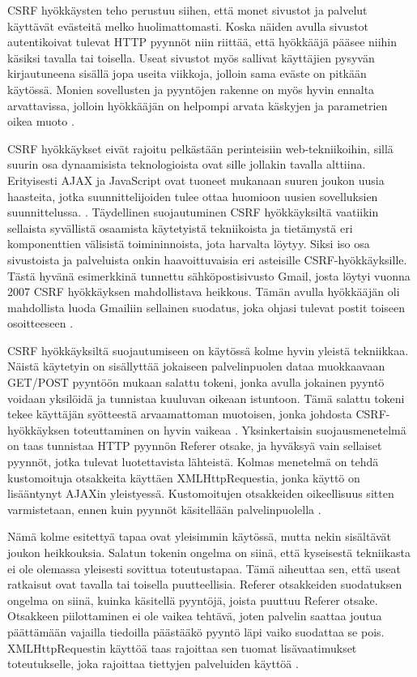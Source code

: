 CSRF hyökkäysten teho perustuu siihen, että monet sivustot ja palvelut käyttävät evästeitä melko huolimattomasti. Koska näiden avulla sivustot autentikoivat tulevat 
HTTP pyynnöt niin riittää, että hyökkääjä pääsee niihin käsiksi tavalla tai toisella. Useat sivustot myös sallivat käyttäjien pysyvän kirjautuneena sisällä
jopa useita viikkoja, jolloin sama eväste on pitkään käytössä. Monien sovellusten ja pyyntöjen rakenne on myös hyvin ennalta arvattavissa, jolloin hyökkääjän
on helpompi arvata käskyjen ja parametrien oikea muoto \cite{WEB2}.

CSRF hyökkäykset eivät rajoitu pelkästään perinteisiin web-tekniikoihin, sillä suurin osa dynaamisista teknologioista ovat sille jollakin 
tavalla alttiina. Erityisesti AJAX ja JavaScript ovat tuoneet mukanaan suuren joukon uusia haasteita, jotka suunnittelijoiden tulee ottaa huomioon uusien
sovelluksien suunnittelussa. \cite{WEB2b}. Täydellinen suojautuminen CSRF hyökkäyksiltä vaatiikin sellaista syvällistä osaamista käytetyistä tekniikoista ja 
tietämystä eri komponenttien välisistä toimininnoista, jota harvalta löytyy. Siksi iso osa sivustoista ja palveluista onkin haavoittuvaisia eri asteisille
CSRF-hyökkäyksille. Tästä hyvänä esimerkkinä tunnettu sähköpostisivusto Gmail, josta löytyi vuonna 2007 CSRF hyökkäyksen mahdollistava heikkous. Tämän avulla
hyökkääjän oli mahdollista luoda Gmailiin sellainen suodatus, joka ohjasi tulevat postit toiseen osoitteeseen \cite{CSRF}. 

CSRF hyökkäyksiltä suojautumiseen on käytössä kolme hyvin yleistä tekniikkaa. Näistä käytetyin on sisällyttää jokaiseen palvelinpuolen dataa muokkaavaan
GET/POST pyyntöön mukaan salattu tokeni, jonka avulla jokainen pyyntö voidaan yksilöidä ja tunnistaa kuuluvan oikeaan istuntoon. Tämä salattu tokeni tekee
käyttäjän syötteestä arvaamattoman muotoisen, jonka johdosta CSRF-hyökkäyksen toteuttaminen on hyvin vaikeaa \cite{WEB2}. Yksinkertaisin suojausmenetelmä on 
taas tunnistaa HTTP pyynnön Referer otsake, ja hyväksyä vain sellaiset pyynnöt, jotka tulevat luotettavista lähteistä. Kolmas menetelmä on tehdä kustomoituja
otsakkeita käyttäen XMLHttpRequestia, jonka käyttö on lisääntynyt AJAXin yleistyessä. Kustomoitujen otsakkeiden oikeellisuus sitten varmistetaan, ennen kuin
pyynnöt käsitellään palvelinpuolella \cite{CSRF}.

Nämä kolme esitettyä tapaa ovat yleisimmin käytössä, mutta nekin sisältävät joukon heikkouksia. Salatun tokenin ongelma on siinä, että kyseisestä tekniikasta ei 
ole olemassa yleisesti sovittua toteutustapaa. Tämä aiheuttaa sen, että useat ratkaisut ovat tavalla tai toisella puutteellisia. Referer otsakkeiden suodatuksen 
ongelma on siinä, kuinka käsitellä pyyntöjä, joista puuttuu Referer otsake. Otsakkeen piilottaminen ei ole vaikea tehtävä, joten palvelin saattaa joutua 
päättämään vajailla tiedoilla päästääkö pyyntö läpi vaiko suodattaa se pois. XMLHttpRequestin käyttöä taas rajoittaa sen tuomat lisävaatimukset toteutukselle,
joka rajoittaa tiettyjen palveluiden käyttöä \cite{CSRF}. 

